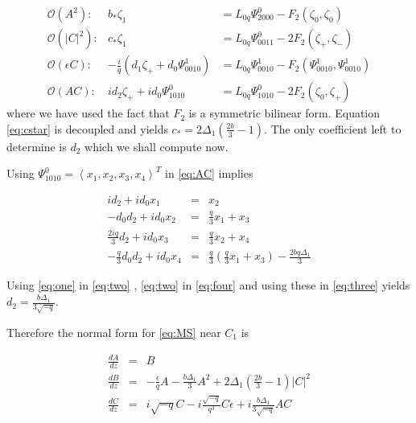 \begin{subequations}
\begin{eqnarray}
\mathcal{O}(A^2): &		b_* \zeta_1 &= L_{0q} \Psi_{2000}^0 - F_2(\zeta_0,\zeta_0) \\
\mathcal{O}(\left|C\right|^2):&	c_* \zeta_1 &= L_{0q} \Psi_{0011}^0 -2 F_2(\zeta_+,\zeta_-) \label{eq:cstar} \\
\mathcal{O}(\epsilon C): &-\frac{i}{q} \left(d_1 \zeta_+ +  d_0 \Psi_{0010}^1\right) &= L_{0q} \Psi_{0010}^1 - F_2(\Psi_{0010}^1,\Psi_{0010}^1) \\
\mathcal{O}(A C): 	&i d_2 \zeta_+ + i d_0 \Psi_{1010}^0 &= L_{0q} \Psi_{1010}^0 - 2 F_2(\zeta_0,\zeta_+) \label{eq:AC}
\end{eqnarray}
\end{subequations}
where we have used the fact that $F_2$ is a symmetric bilinear form. Equation \eqref{eq:cstar} is decoupled and yields 
$ c_* = 2 \Delta_1 \left( \frac{2 b}{3}  - 1\right)$. The only coefficient left to determine is $d_2$ which we shall compute now. 

Using $\Psi_{1010}^0 = \left<x_1,x_2,x_3,x_4\right>^T$ in \eqref{eq:AC} implies 

\begin{subequations}
\begin{eqnarray}
i d_2 + i d_0 x_1 &=& x_2 \label{eq:one} \\
- d_0 d_2 + i d_0 x_2 &=& \frac{q}{3} x_1 + x_3 \label{eq:two} \\
\frac{2 i q}{3} d_2 + i d_0 x_3 &=& \frac{q}{3} x_2 + x_4  \label{eq:three} \\
- \frac{q}{3} d_0 d_2 + i d_0 x_4 &=& \frac{q}{3}\left(\frac{q}{3} x_1 + x_3 \right) - \frac{ 2 b q \Delta_1} {3} \label{eq:four}
\end{eqnarray}
\end{subequations}

Using \eqref{eq:one} in \eqref{eq:two} , \eqref{eq:two} in \eqref{eq:four} and
using these in \eqref{eq:three} yields $ d_2 = \frac{ b \Delta_1 }{ 3 \sqrt{-q} }$.

Therefore the normal form for \eqref{eq:MS} near $C_1$ is 

\begin{subequations}\label{eq:NORMAL}
\begin{eqnarray} 
\frac{dA}{dz} &=& B  \label{eq:normalA} \\
\frac{dB}{dz} &=& -\frac{\epsilon}{q} A - \frac{b \Delta_1 }{3} A^2 + 2 \Delta_1 \left(\frac{2 b }{3} - 1\right) \left|C\right|^2  \label{eq:normalB} \\
\frac{dC}{dz} &=& i \sqrt{-q} C - i \frac{\sqrt{-q} }{q^3} C\epsilon + i \frac{b \Delta_1}{3 \sqrt{-q}} A C \label{eq:normalC}
\end{eqnarray}
\end{subequations}

